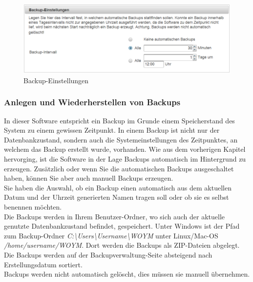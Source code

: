 \documentclass[fontsize=12pt]{scrartcl}
\begin{document}
 
\begin{figure}[H]
\includegraphics[width=\textwidth]{images/systemSettings4.png}
\caption{Backup-Einstellungen}
\end{figure}

\subsubsection{Anlegen und Wiederherstellen von Backups}

In dieser Software entspricht ein Backup im Grunde einem Speicherstand des System zu einem gewissen Zeitpunkt. In einem Backup ist nicht nur der Datenbankzustand, sondern auch die Systemeinstellungen des Zeitpunktes, an welchem das Backup erstellt wurde, vorhanden. Wie aus dem vorherigen Kapitel hervorging, ist die Software in der Lage Backups automatisch im Hintergrund zu erzeugen. Zusätzlich oder wenn Sie die automatischen Backups ausgeschaltet haben, können Sie aber auch manuell Backups erzeugen. \\
Sie haben die Auswahl, ob ein Backup einen automatisch aus dem aktuellen Datum und der Uhrzeit generierten Namen tragen soll oder ob sie es selbst benennen möchten.\\
Die Backups werden in Ihrem Benutzer-Ordner, wo sich auch der aktuelle genutzte Datenbankzustand befindet, gespeichert. Unter Windows ist der Pfad zum Backup-Ordner \textit{C:\textbackslash{}Users\textbackslash{}Username\textbackslash{}WOYM} unter Linux/Mac-OS \textit{/home/username/WOYM}. Dort werden die Backups als ZIP-Dateien abgelegt.\\
Die Backups werden auf der Backupverwaltung-Seite absteigend nach Erstellungsdatum sortiert.\\
Backups werden nicht automatisch gelöscht, dies müssen sie manuell übernehmen.
\end{document}
